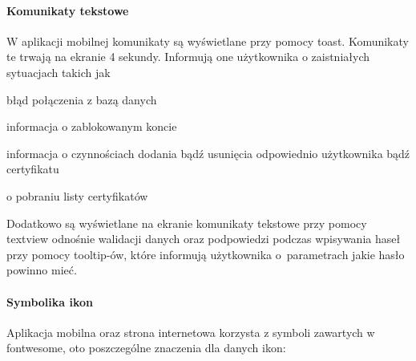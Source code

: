 \paragraph*{Komunikaty tekstowe}
W aplikacji mobilnej komunikaty są wyświetlane przy pomocy toast. Komunikaty te  trwają na ekranie 4 sekundy. Informują one użytkownika o zaistniałych sytuacjach takich jak
\begin{itemize*}
	\item błąd połączenia z bazą danych
	\item informacja o zablokowanym koncie 
	\item informacja o czynnościach dodania bądź usunięcia odpowiednio użytkownika bądź certyfikatu
	\item o pobraniu listy certyfikatów
\end{itemize*}

Dodatkowo są wyświetlane na ekranie komunikaty tekstowe przy pomocy  textview odnośnie walidacji danych oraz podpowiedzi podczas wpisywania haseł przy pomocy tooltip-ów, które informują użytkownika o~parametrach jakie hasło powinno mieć.

\paragraph*{Symbolika ikon}\label{Symbolika ikon}
Aplikacja mobilna oraz strona internetowa korzysta z symboli zawartych w fontwesome, oto poszczególne znaczenia dla danych ikon:

